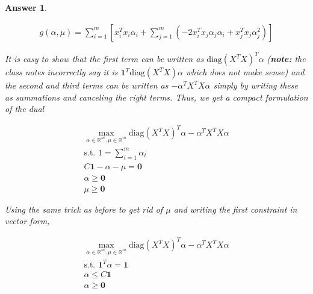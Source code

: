 \documentclass[12pt]{article}
\theoremstyle{colon}
\newtheorem*{answer}{Answer}
\begin{document}
\begin{answer}
\begin{enumerate}[label=\alph*)]
      \begin{gather*}
        g(\alpha, \mu) = \sum_{i=1}^m \left[ x_i^T x_i \alpha_i + \sum_{j=1}^m \left( -2x_i^T x_j \alpha_j \alpha_i + x_j^T x_j \alpha_j^2 \right) \right]
      \end{gather*}

      It is easy to show that the first term can be written as $ \text{diag}(X^T X)^T \alpha$ (\textbf{note:} the class notes incorrectly say it is $\bm{1}^T \text{diag}(X^T X) \alpha$ which does not make sense) and the second and third terms can be written as $-\alpha^T X^T X \alpha$ simply by writing these as summations and canceling the right terms. Thus, we get a compact formulation of the dual

      \begin{gather*}
        \max_{\alpha \in \mathbb{R}^m, \mu \in \mathbb{R}^m} \text{diag}(X^T X)^T \alpha - \alpha^T X^T X \alpha \\
        \text{s.t. } 1 = \sum_{i=1}^m \alpha_i \\
        C \bm{1} - \alpha - \mu = \bm{0} \\
        \alpha \geq \bm{0} \\
        \mu \geq \bm{0}
      \end{gather*}

      Using the same trick as before to get rid of $\mu$ and writing the first constraint in vector form,

      \begin{gather*}
        \max_{\alpha \in \mathbb{R}^m, \mu \in \mathbb{R}^m} \text{diag}(X^T X)^T  \alpha - \alpha^T X^T X \alpha \\
        \text{s.t. } \bm{1}^T \alpha = \bm{1} \\
        \alpha \leq C \bm{1} \\
        \alpha \geq \bm{0} \\
      \end{gather*}


\end{enumerate}
\end{answer}
\end{document}
